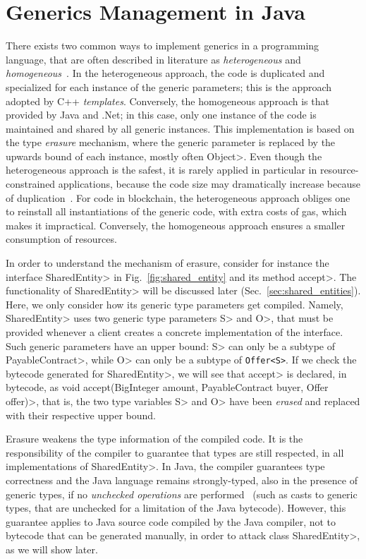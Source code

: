 \section{Generics Management in Java}\label{sec:java_generics}

There exists two common ways to implement generics in a programming language,
that are often described in literature as \emph{heterogeneous}
and \emph{homogeneous}~\cite{generics_categories}.
In the heterogeneous approach, the code is duplicated and specialized for each instance
of the generic parameters; this is the approach adopted by C++ \emph{templates}.
Conversely, the homogeneous approach is that provided by Java and .Net; in this case,
only one instance of the code is maintained and shared by all generic instances.
This implementation is based on the type \emph{erasure} mechanism, where the generic parameter
is replaced by the upwards bound of each instance, mostly often \<Object>.
Even though the heterogeneous approach is the safest, it is rarely applied in particular
in resource-constrained applications, because the code size may dramatically increase
because of duplication~\cite{generics_embedded_systems}. For code in blockchain,
the heterogeneous approach obliges one to reinstall all instantiations of the generic code,
with extra costs of gas, which makes it impractical.
Conversely, the homogeneous approach ensures a smaller consumption of resources.

In order to understand the mechanism of erasure, consider for instance
the interface \<SharedEntity> in Fig.~\ref{fig:shared_entity} and its method \<accept>.
The functionality of \<SharedEntity> will be discussed later (Sec.~\ref{sec:shared_entities}).
Here, we only consider how its generic type parameters get compiled.
Namely, \<SharedEntity> uses two generic type parameters \<S> and \<O>, that must be provided
whenever a client creates a concrete implementation of the interface.
Such generic parameters have an upper bound: \<S> can only be a subtype of \<PayableContract>,
while \<O> can only be a subtype of {\codesize\texttt{Offer<S>}}. If we check the bytecode
generated for \<SharedEntity>, we will see that \<accept> is declared, in bytecode, as
\<void accept(BigInteger amount, PayableContract buyer, Offer offer)>, that is,
the two type variables \<S> and \<O> have been \emph{erased} and replaced with their
respective upper bound.

Erasure weakens the type information of the compiled code. It is the responsibility of the
compiler to guarantee that types are still respected, in all implementations of \<SharedEntity>.
In Java, the compiler guarantees type correctness and the Java language remains strongly-typed,
also in the presence of generic types,
if no \emph{unchecked operations} are performed~\cite{NaftalinW06} (such as casts to generic types,
that are unchecked for a limitation of the Java bytecode).
However, this guarantee applies to Java source code compiled by the Java compiler,
not to bytecode that can be generated manually, in order to attack class \<SharedEntity>,
as we will show later.
